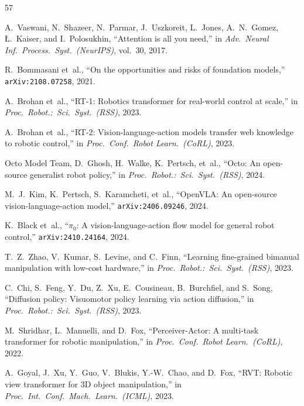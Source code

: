 \documentclass[10pt]{article}
\begin{document}
\begin{thebibliography}{57}
\small
\raggedright
\setlength{\itemsep}{1.1pt}
\setlength{\parskip}{0pt}

A.~Vaswani, N.~Shazeer, N.~Parmar, J.~Uszkoreit, L.~Jones, A.~N.~Gomez, {\L}.~Kaiser, and I.~Polosukhin, ``Attention is all you need,'' in \emph{Adv.\ Neural Inf.\ Process.\ Syst.\ (NeurIPS)}, vol.~30, 2017.

R.~Bommasani et~al., ``On the opportunities and risks of foundation models,'' \texttt{arXiv:2108.07258}, 2021.

A.~Brohan et~al., ``RT-1: Robotics transformer for real-world control at scale,'' in \emph{Proc.\ Robot.:\ Sci.\ Syst.\ (RSS)}, 2023.

A.~Brohan et~al., ``RT-2: Vision-language-action models transfer web knowledge to robotic control,'' in \emph{Proc.\ Conf.\ Robot Learn.\ (CoRL)}, 2023.

Octo Model Team, D.~Ghosh, H.~Walke, K.~Pertsch, et~al., ``Octo: An open-source generalist robot policy,'' in \emph{Proc.\ Robot.:\ Sci.\ Syst.\ (RSS)}, 2024.

M.~J.~Kim, K.~Pertsch, S.~Karamcheti, et~al., ``OpenVLA: An open-source vision-language-action model,'' \texttt{arXiv:2406.09246}, 2024.

K.~Black et~al., ``$\pi_0$: A vision-language-action flow model for general robot control,'' \texttt{arXiv:2410.24164}, 2024.

T.~Z.~Zhao, V.~Kumar, S.~Levine, and C.~Finn, ``Learning fine-grained bimanual manipulation with low-cost hardware,'' in \emph{Proc.\ Robot.:\ Sci.\ Syst.\ (RSS)}, 2023.

C.~Chi, S.~Feng, Y.~Du, Z.~Xu, E.~Cousineau, B.~Burchfiel, and S.~Song, ``Diffusion policy: Visuomotor policy learning via action diffusion,'' in \emph{Proc.\ Robot.:\ Sci.\ Syst.\ (RSS)}, 2023.

M.~Shridhar, L.~Manuelli, and D.~Fox, ``Perceiver-Actor: A multi-task transformer for robotic manipulation,'' in \emph{Proc.\ Conf.\ Robot Learn.\ (CoRL)}, 2022.

A.~Goyal, J.~Xu, Y.~Guo, V.~Blukis, Y.-W.~Chao, and D.~Fox, ``RVT: Robotic view transformer for 3D object manipulation,'' in \emph{Proc.\ Int.\ Conf.\ Mach.\ Learn.\ (ICML)}, 2023.


\end{thebibliography}
\end{document}
